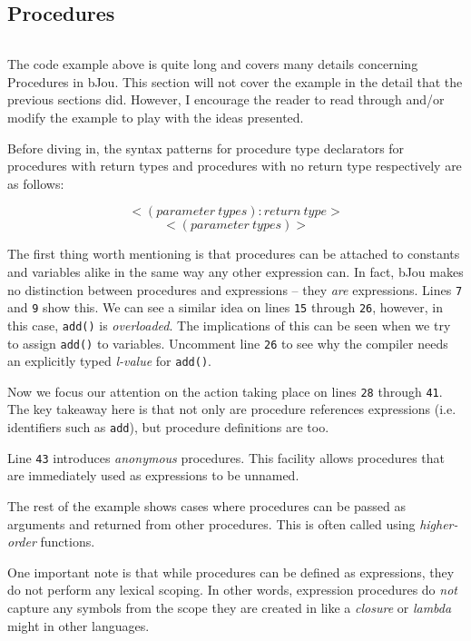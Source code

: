 \documentclass[12pt]{article}
\begin{document}
	\newpage
	\subsection*{Procedures}
		\begin{centering}
			\inputminted[breaklines, fontsize=\small, baselinestretch=0.8, frame=lines, linenos]{bash}{"../tests/test/demo4.bjou"}
		\end{centering}
		
		The code example above is quite long and covers many details concerning Procedures in bJou. This section will not cover the example in the detail that the previous sections did. However, I encourage the reader to read through and/or modify the example to play with the ideas presented.

		Before diving in, the syntax patterns for procedure type declarators for procedures with return types and procedures with no return type respectively are as follows:

		$$<(parameter\ types) : return\ type>$$
		$$<(parameter\ types)>$$

		The first thing worth mentioning is that procedures can be attached to constants and variables alike in the same way any other expression can. In fact, bJou makes no distinction between procedures and expressions -- they \emph{are} expressions. Lines \texttt{7} and \texttt{9} show this. We can see a similar idea on lines \texttt{15} through \texttt{26}, however, in this case, \texttt{add()} is \emph{overloaded}. The implications of this can be seen when we try to assign \texttt{add()} to variables. Uncomment line \texttt{26} to see why the compiler needs an explicitly typed \emph{l-value} for \texttt{add()}.

		Now we focus our attention on the action taking place on lines \texttt{28} through \texttt{41}. The key takeaway here is that not only are procedure references expressions (i.e. identifiers such as \texttt{add}), but procedure definitions are too.

		Line \texttt{43} introduces \emph{anonymous} procedures. This facility allows procedures that are immediately used as expressions to be unnamed.

		The rest of the example shows cases where procedures can be passed as arguments and returned from other procedures. This is often called using \emph{higher-order} functions.

		One important note is that while procedures can be defined as expressions, they do not perform any lexical scoping. In other words, expression procedures do \emph{not} capture any symbols from the scope they are created in like a \emph{closure} or \emph{lambda} might in other languages.
\end{document}
